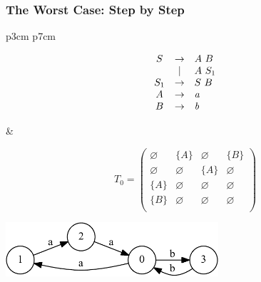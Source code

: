 \documentclass[xcolor=table]{beamer}
\begin{document}
\begin{frame}
  \transwipe[direction=90]
  \frametitle{The Worst Case: Step by Step}
\begin{tabular}{p{3cm} p{7cm} }
\begin{figure}[h]
   \[
\begin{array}{ccl}
    S & \rightarrow & A \ B \\
      & | & A \ S_1 \\
    S_1 & \rightarrow & S \ B \\
    A & \rightarrow & \text{\emph{a}} \\ 
    B & \rightarrow & \text{\emph{b}} \\ 
\end{array}
\]
\label{ProductionRulesExampleQueryCNF}
\end{figure}
  
&   
  
\begin{figure}[h]
\[
T_0 = \begin{pmatrix}
    \varnothing & \{A\}       & \varnothing & \{B\}       \\
    \varnothing & \varnothing & \{A\}       & \varnothing \\
    \{A\}       & \varnothing & \varnothing & \varnothing \\
    \{B\}       & \varnothing & \varnothing & \varnothing \\
\end{pmatrix}
\]

\end{figure}
 \end{tabular}

\begin{center}
  \includegraphics[height=2cm]{pictures/example_graph.pdf}
\end{center}

\end{frame}     
 
\end{document}
